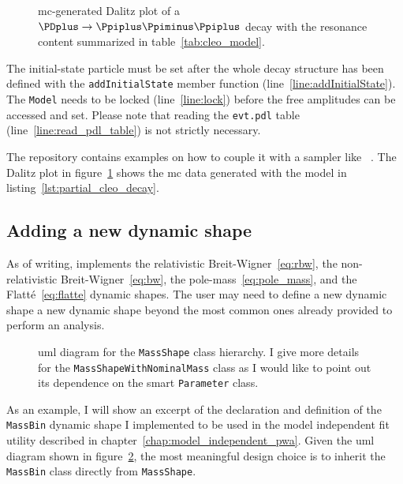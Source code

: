        
        \begin{figure}
            \centering
            
            \caption{\ac{mc}-generated Dalitz plot of a $\PDplus \to \Ppiplus\Ppiminus\Ppiplus$ decay with the resonance content summarized in table~\ref{tab:cleo_model}.}
            \label{fig:partial_cleo_decay}
        \end{figure}
        The initial-state particle must be set after the whole decay structure has been defined with the \lstinline!addInitialState! member function (line~\ref{line:addInitialState}).
        The \lstinline!Model! needs to be locked (line~\ref{line:lock}) before the free amplitudes can be accessed and set.
        Please note that reading the \texttt{evt.pdl} table (line~\ref{line:read_pdl_table}) is not strictly necessary.


        The  repository contains examples on how to couple it with a sampler like ~\cite{Caldwell20092197}.
        The Dalitz plot in figure~\ref{fig:partial_cleo_decay} shows the \ac{mc} data generated with the model in listing~\ref{lst:partial_cleo_decay}.


        \subsection{Adding a new dynamic shape}

        As of writing,  implements the relativistic Breit-Wigner~\eqref{eq:rbw}, the non-relativistic Breit-Wigner~\eqref{eq:bw}, the pole-mass~\eqref{eq:pole_mass}, and the Flatté~\eqref{eq:flatte} dynamic shapes.
        The user may need to define a new dynamic shape a new dynamic shape beyond the most common ones already provided to perform an analysis.


    \begin{figure}
        \centering
        
        \caption{\Ac{uml} diagram for the \lstinline!MassShape! class hierarchy. I give more details for the \lstinline!MassShapeWithNominalMass! class as I would like to point out its dependence on the smart \lstinline!Parameter! class.}
        \label{fig:mass_shape_hierarchy}
    \end{figure}
    As an example, I will show an excerpt of the declaration and definition of the \lstinline!MassBin! dynamic shape I implemented to be used in the model independent fit utility described in chapter~\ref{chap:model_independent_pwa}.
    Given the \ac{uml} diagram shown in figure~\ref{fig:mass_shape_hierarchy}, the most meaningful design choice is to inherit the \lstinline!MassBin! class directly from \lstinline!MassShape!.
    

